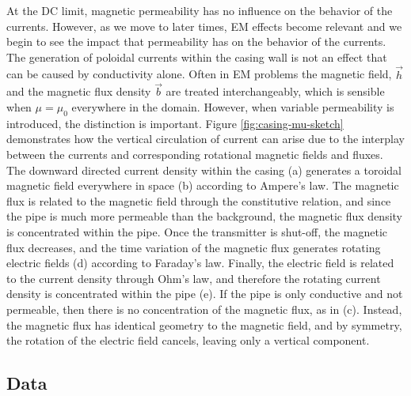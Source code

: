 At the DC limit, magnetic permeability has no influence on the behavior of the currents. However, as we move to later times, EM effects become relevant and we begin to see the impact that permeability has on the behavior of the currents. The generation of poloidal currents within the casing wall is not an effect that can be caused by conductivity alone.  Often in EM problems the magnetic field, $\vec{h}$ and the magnetic flux density $\vec{b}$ are treated interchangeably, which is sensible when $\mu = \mu_0$ everywhere in the domain. However, when variable permeability is introduced, the distinction is important. Figure \ref{fig:casing-mu-sketch} demonstrates how the vertical circulation of current can arise due to the interplay between the currents and corresponding rotational magnetic fields and fluxes. The downward directed current density within the casing (a) generates a toroidal magnetic field everywhere in space (b) according to Ampere’s law. The magnetic flux is related to the magnetic field through the constitutive relation, and since the pipe is much more permeable than the background, the magnetic flux density is concentrated within the pipe. Once the transmitter is shut-off, the magnetic flux decreases, and the time variation of the magnetic flux generates rotating electric fields (d) according to Faraday’s law. Finally, the electric field is related to the current density through Ohm’s law, and therefore the rotating current density is concentrated within the pipe (e). If the pipe is only conductive and not permeable, then there is no concentration of the magnetic flux, as in (c). Instead, the magnetic flux has identical geometry to the magnetic field, and by symmetry, the rotation of the electric field cancels, leaving only a vertical component.




\subsection{Data}


